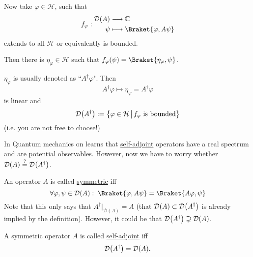 \documentclass[12pt]{article}
\numberwithin{equation}{section}
\theoremstyle{plain}
\theoremstyle{plain}
\renewcommand{\phi}{\varphi}
\begin{document}
\begin{enumerate}
	Now take $\phi \in \mathcal H$, such that 
	\[
		f_{\phi}: \begin{aligned} \mathcal D(A) &\longrightarrow \mathbb{C}	\\
			\psi &\longmapsto \Braket{\phi,A\psi}
		\end{aligned}
	\]
	extends to all $\mathcal H$ or equivalently is bounded.
	
	Then there is $\eta_{\phi} \in \mathcal H$ such that $f_{\phi}(\psi) = \Braket{\eta_{\phi},\psi}$.
	
	$\eta_{\phi}$ is usually denoted as ``$A^{\dagger}\phi$". Then 
	\[
		A^{\dagger} \phi \longmapsto \eta_{\phi} = A^{\dagger}\phi	
	\]
	is linear and \[
	\mathcal D\mleft( A^{\dagger} \mright) := \mleft\{ \phi \in \mathcal H \, \big| \, f_{\phi} \text{ is bounded} \mright\}
	\]
	(i.e. you are not free to choose!)
	
	In Quantum mechanics on learns that \underline{self-adjoint} operators have a real spectrum and are potential observables. However, now we have to worry whether $\mathcal D(A) \overset{?}{=} \mathcal D\mleft(A^{\dagger}\mright)$.
	
\end{enumerate}

\begin{defn}
	An operator $A$ is called \underline{symmetric} iff 
	\[
		\forall \phi, \psi \in \mathcal D(A): \; \Braket{\phi, A \psi} = \Braket{A\phi,\psi}	
	\]
	Note that this only says that $A^{\dagger}\big|_{\mathcal D(A)} = A$ (that $\mathcal D(A) \subset \mathcal D \mleft( A^{\dagger} \mright)$ is already implied by the definition). However, it could be that $\mathcal D \mleft( A^{\dagger} \mright) \supsetneq \mathcal D \mleft( A \mright)$.
	
	A symmetric operator $A$ is called \underline{self-adjoint} iff 
	\[
		\mathcal D\mleft(A^{\dagger}\mright) = \mathcal D(A).	
	\]	
	
\end{defn}
\end{document}
